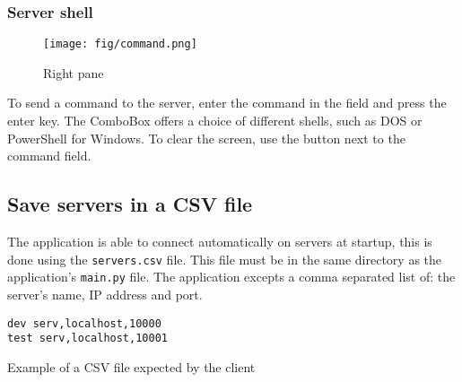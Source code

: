 \documentclass{article}
\begin{document}
\subsubsection{Server shell}
\begin{figure}[H]
    \begin{center}
        \texttt{[image: fig/command.png]}
    \end{center}
    \caption{Right pane}
    \label{client:right}
\end{figure}
To send a command to the server, enter the command in the field and press the
enter key. The ComboBox offers a choice of different shells, such as DOS or
PowerShell for Windows. To clear the screen, use the button next to the command
field.

\newpage
\subsection{Save servers in a CSV file}
The application is able to connect automatically on servers at startup, this is
done using the \verb|servers.csv| file. This file must be in the same directory
as the application's \verb|main.py| file. The application excepts a comma
separated list of: the server's name, IP address and port.
\begin{listing}[H]
    \begin{verbatim}
dev serv,localhost,10000
test serv,localhost,10001
    \end{verbatim}
    \caption{Example of a CSV file expected by the client}
    \label{venv:csv}
\end{listing}
\end{document}
